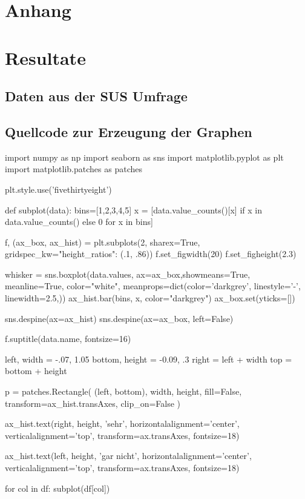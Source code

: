 \section{Anhang}



\printnoidxglossaries
\printglossary[type=\acronymtype]

\section*{Resultate}

\subsection*{Daten aus der SUS Umfrage}



\subsection*{Quellcode zur Erzeugung der Graphen}

\begin{python}
import numpy as np
import seaborn as sns
import matplotlib.pyplot as plt
import matplotlib.patches as patches


plt.style.use('fivethirtyeight')

def subplot(data):
    bins=[1,2,3,4,5]
    x = [data.value_counts()[x] if x in data.value_counts() else 0 for x in bins]

    f, (ax_box, ax_hist) = plt.subplots(2, sharex=True, gridspec_kw={"height_ratios": (.1, .86)})
    f.set_figwidth(20)
    f.set_figheight(2.3)

    whisker = sns.boxplot(data.values,
                          ax=ax_box,showmeans=True,
                          meanline=True, color="white",
                          meanprops=dict(color='darkgrey', linestyle='-', linewidth=2.5,))
    ax_hist.bar(bins, x, color="darkgrey")
    ax_box.set(yticks=[])

    sns.despine(ax=ax_hist)
    sns.despine(ax=ax_box, left=False)

    f.suptitle(data.name, fontsize=16)

    left, width = -.07, 1.05
    bottom, height = -0.09, .3
    right = left + width
    top = bottom + height

    p = patches.Rectangle(
    (left, bottom), width, height,
    fill=False, transform=ax_hist.transAxes, clip_on=False
    )

    ax_hist.text(right, height, 'sehr',
        horizontalalignment='center',
        verticalalignment='top',
        transform=ax.transAxes,
        fontsize=18)

    ax_hist.text(left, height, 'gar nicht',
        horizontalalignment='center',
        verticalalignment='top',
        transform=ax.transAxes,
        fontsize=18)


for col in df:
    subplot(df[col])
\end{python}
